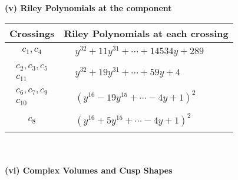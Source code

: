 \documentclass[1p]{elsarticle_modified}
\theoremstyle{definition}
\begin{document}
\newpage\renewcommand{\arraystretch}{1}
\flushleft \textbf{(v) Riley Polynomials at the component}\newline \\
\begin{tabular}{m{50pt}|m{274pt}}
Crossings & \hspace{64pt}Riley Polynomials at each crossing \\
\hline $$\begin{aligned}c_{1},c_{4}\end{aligned}$$&$\begin{aligned}
&y^{32}+11 y^{31}+\cdots+14534 y+289
\end{aligned}$\\
\hline $$\begin{aligned}c_{2},c_{3},c_{5}\\c_{11}\end{aligned}$$&$\begin{aligned}
&y^{32}+19 y^{31}+\cdots+59 y+4
\end{aligned}$\\
\hline $$\begin{aligned}c_{6},c_{7},c_{9}\\c_{10}\end{aligned}$$&$\begin{aligned}
&(y^{16}-19 y^{15}+\cdots-4 y+1)^{2}
\end{aligned}$\\
\hline $$\begin{aligned}c_{8}\end{aligned}$$&$\begin{aligned}
&(y^{16}+5 y^{15}+\cdots-4 y+1)^{2}
\end{aligned}$\\
\hline
\end{tabular}\\~\\
\newpage\flushleft \textbf{(vi) Complex Volumes and Cusp Shapes}
\end{document}
